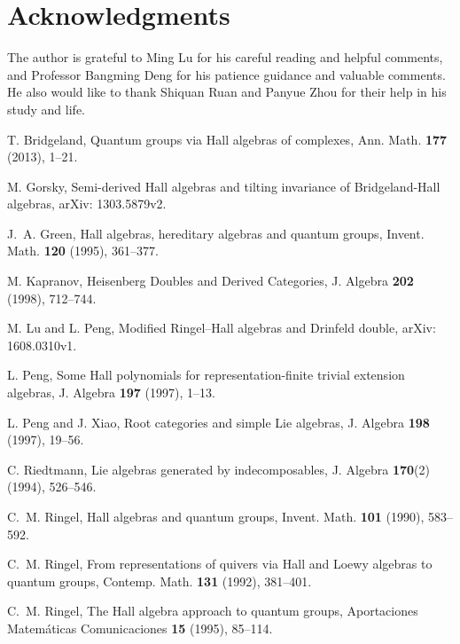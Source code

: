 \documentclass[reqno,12pt]{amsart}
\numberwithin{equation}{section}
\theoremstyle{plain} %
\theoremstyle{definition} %
\begin{document}
\section*{Acknowledgments}

The author is grateful to Ming Lu for his careful reading and helpful comments, and Professor Bangming Deng for his patience guidance and valuable comments. He also would like to thank Shiquan Ruan and Panyue Zhou for their help in his study and life.




\begin{thebibliography}{99}

 T. Bridgeland, {Quantum groups via Hall algebras of complexes},
{Ann. Math.} {\bf 177} (2013), 1--21.



 M. Gorsky, {Semi-derived Hall algebras and tilting invariance of Bridgeland-Hall algebras}, arXiv: 1303.5879v2.

 J.~A. Green,
{Hall algebras, hereditary algebras and quantum groups}, Invent.
Math. {\bf 120} (1995), 361--377.

 M. Kapranov, {Heisenberg Doubles and Derived Categories}, J. Algebra {\bf 202} (1998), 712--744.

 M. Lu and L. Peng, {Modified Ringel--Hall algebras and Drinfeld double}, arXiv: 1608.0310v1.

 L. Peng, {Some Hall polynomials for representation-finite trivial extension algebras},
J. Algebra {\bf 197} (1997), 1--13.

 L. Peng and J. Xiao, {Root categories and simple Lie algebras}, J. Algebra {\bf
198} (1997), 19--56.

 C. Riedtmann, {Lie algebras generated by indecomposables}, J. Algebra {\bf 170}(2) (1994), 526--546.

 C.~M. Ringel, {Hall algebras and quantum groups},
Invent. Math. {\bf 101} (1990), 583--592.

 C.~M. Ringel, {From representations of quivers via Hall
and Loewy algebras to quantum groups}, Contemp. Math. {\bf 131}
(1992), 381--401.

 C.~M. Ringel,
{The Hall algebra approach to quantum groups}, Aportaciones
Matem\'aticas Comunicaciones {\bf 15} (1995), 85--114.



\end{thebibliography}
\end{document}
